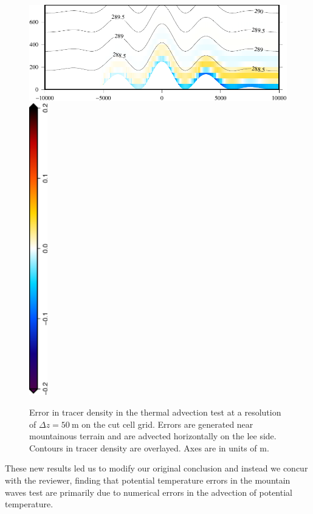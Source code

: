 \documentclass[a4paper]{article}
\begin{document}
\begin{figure}
	\centering
	\includegraphics{tracerDiffMountain.pdf} \\
	\includegraphics[height=5in,angle=270]{tracerDiffMountain_T_diff.eps}
%
	\caption{Error in tracer density in the thermal advection test at a resolution of $\Delta z = \SI{50}{\meter}$ on the cut cell grid.  Errors are generated near mountainous terrain and are advected horizontally on the lee side.  Contours in tracer density are overlayed.  Axes are in units of \si{\meter}.}
	\label{fig:tracerError}
\end{figure}

These new results led us to modify our original conclusion and instead we concur with the reviewer, finding that potential temperature errors in the mountain waves test are primarily due to numerical errors in the advection of potential temperature.
\end{document}
